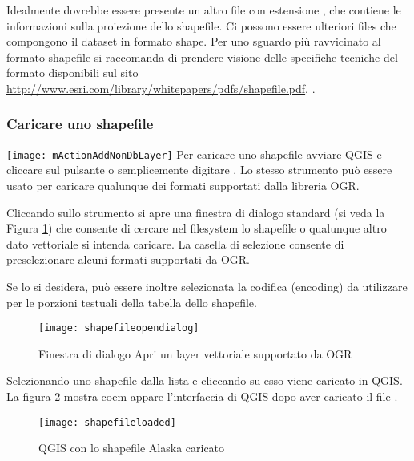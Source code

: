 Idealmente dovrebbe essere presente un altro file con estensione
, che contiene le informazioni sulla proiezione dello
shapefile. Ci possono essere ulteriori files che compongono il dataset in
formato shape. Per uno sguardo più ravvicinato al formato shapefile si
raccomanda di prendere visione delle specifiche tecniche del formato
disponibili sul sito \url{http://www.esri.com/library/whitepapers/pdfs/shapefile.pdf}.
.

\subsubsection{Caricare uno shapefile}\label{sec:load_shapefile}
\texttt{[image: mActionAddNonDbLayer]} 
Per caricare uno shapefile avviare QGIS e cliccare sul pulsante
 o semplicemente digitare . Lo stesso
strumento può essere usato per caricare qualunque dei formati supportati dalla
libreria OGR.

Cliccando sullo strumento si apre una finestra di dialogo standard (si veda la
Figura \ref{fig:openshapefile}) che consente di cercare nel filesystem lo
shapefile o qualunque altro dato vettoriale si intenda caricare. 
La casella di selezione  consente di
preselezionare alcuni formati supportati da OGR.

Se lo si desidera, può essere inoltre selezionata la codifica (encoding) da utilizzare per le
porzioni testuali della tabella dello shapefile.

\begin{figure}[ht]
   \begin{center}
   \caption{Finestra di dialogo Apri un layer vettoriale supportato da OGR \nixcaption}\label{fig:openshapefile}\smallskip
   \texttt{[image: shapefileopendialog]}
\end{center} 
\end{figure}

Selezionando uno shapefile dalla lista e cliccando su  esso viene
caricato in QGIS. La figura \ref{fig:loadedshapefile} mostra coem appare
l'interfaccia di QGIS dopo aver caricato il file .

\begin{figure}[ht]
   \begin{center}
   \caption{QGIS con lo shapefile Alaska caricato \nixcaption}\label{fig:loadedshapefile}\smallskip
   \texttt{[image: shapefileloaded]}
\end{center} 
\end{figure}

